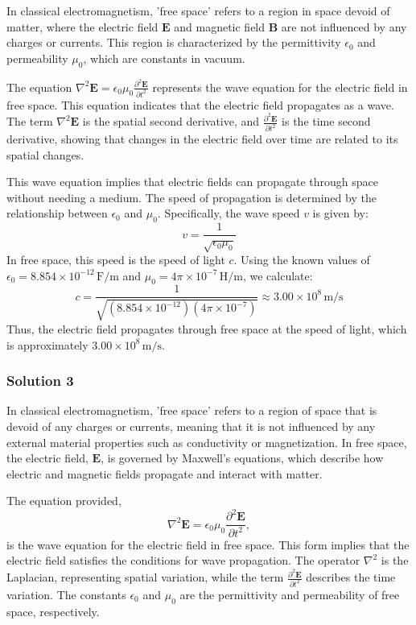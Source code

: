\documentclass{article}
\begin{document}
In classical electromagnetism, 'free space' refers to a region in space devoid of matter, where the electric field $\mathbf{E}$ and magnetic field $\mathbf{B}$ are not influenced by any charges or currents. This region is characterized by the permittivity $\epsilon_0$ and permeability $\mu_0$, which are constants in vacuum.

The equation $\nabla^2 \mathbf{E} = \epsilon_0 \mu_0 \frac{\partial^2 \mathbf{E}}{\partial t^2}$ represents the wave equation for the electric field in free space. This equation indicates that the electric field propagates as a wave. The term $\nabla^2 \mathbf{E}$ is the spatial second derivative, and $\frac{\partial^2 \mathbf{E}}{\partial t^2}$ is the time second derivative, showing that changes in the electric field over time are related to its spatial changes.

This wave equation implies that electric fields can propagate through space without needing a medium. The speed of propagation is determined by the relationship between $\epsilon_0$ and $\mu_0$. Specifically, the wave speed $v$ is given by:
\[
v = \frac{1}{\sqrt{\epsilon_0 \mu_0}}
\]
In free space, this speed is the speed of light $c$. Using the known values of $\epsilon_0 = 8.854 \times 10^{-12} \, \mathrm{F/m}$ and $\mu_0 = 4\pi \times 10^{-7} \, \mathrm{H/m}$, we calculate:
\[
c = \frac{1}{\sqrt{(8.854 \times 10^{-12})(4\pi \times 10^{-7})}} \approx 3.00 \times 10^8 \, \mathrm{m/s}
\]
Thus, the electric field propagates through free space at the speed of light, which is approximately $3.00 \times 10^8 \, \mathrm{m/s}$.

\subsubsection{Solution 3}
In classical electromagnetism, 'free space' refers to a region of space that is devoid of any charges or currents, meaning that it is not influenced by any external material properties such as conductivity or magnetization. In free space, the electric field, $\mathbf{E}$, is governed by Maxwell's equations, which describe how electric and magnetic fields propagate and interact with matter.

The equation provided,
\[
\nabla^2 \mathbf{E} = \epsilon_0 \mu_0 \frac{\partial^2 \mathbf{E}}{\partial t^2},
\]
is the wave equation for the electric field in free space. This form implies that the electric field satisfies the conditions for wave propagation. The operator $\nabla^2$ is the Laplacian, representing spatial variation, while the term $\frac{\partial^2 \mathbf{E}}{\partial t^2}$ describes the time variation. The constants $\epsilon_0$ and $\mu_0$ are the permittivity and permeability of free space, respectively.
\end{document}
